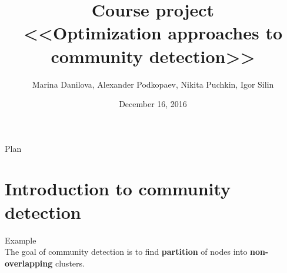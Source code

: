 \documentclass{beamer}
\theoremstyle{definition}
\theoremstyle{plain}
\theoremstyle{remark}
\begin{document}
\setlength{\abovedisplayskip}{5pt}
\setlength{\belowdisplayskip}{5pt}

	\title[\hbox to 60mm{Optimization approaches to community detection \hfill\insertframenumber\,/\,16}]
			{ Course project \\ <<Optimization approaches to community detection>>}
	\author[M. Danilova, A. Podkopaev, N. Puchkin, I. Silin]{\large Marina Danilova, Alexander Podkopaev, Nikita Puchkin, Igor Silin}

\date{\footnotesize{December 16, 2016}}

	\begin{frame}
		\titlepage
	\end{frame}

	\begin{frame}{Plan}
		  \tableofcontents[
		    sectionstyle=show/show,
		    subsectionstyle=show/show/show
		  ]
	\end{frame}

	
	\section{Introduction to community detection}

			\begin{frame}{Example}
				\vspace{-17pt}
				\\
				The goal of community detection is to find \textbf{partition} of nodes into \textbf{non-overlapping} clusters.
			\end{frame}
		
\end{document}
